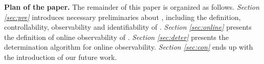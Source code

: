 \medskip\noindent
{\bf Plan of the paper.}
The remainder of this paper is organized as follows.
 {\em Section \ref{sec:pre}} introduces necessary preliminaries about \BCNs, including the definition, controllability, observability and identifiability of \BCNs. {\em Section \ref{sec:online}} presents the definition of online observability of \BCNs. {\em Section \ref{sec:deter}} presents the determination algorithm for online observability. 
 {\em Section \ref{sec:con}} ends up with the introduction of our future work.

